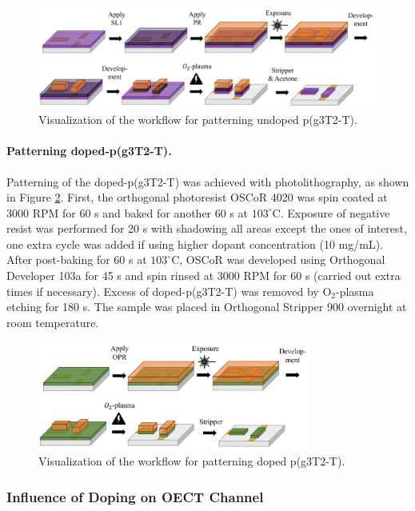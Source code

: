 \begin{figure}[ht]
	\centering
	\includegraphics[width=12cm]{Images/pdf/undoped-patterning.pdf}
	\caption{Visualization of the workflow for patterning undoped p(g3T2-T).}
	\label{fig:undopedpat}
\end{figure}

\paragraph{Patterning doped-p(g3T2-T).}Patterning of the doped-p(g3T2-T) was achieved with photolithography, as shown in Figure \ref{fig:dopedpat}. First, the orthogonal photoresist OSCoR 4020 was spin coated at 3000 RPM for 60 s and baked for another 60 s at $103^{\circ}$C. Exposure of negative resist was performed for 20 s with shadowing all areas except the ones of interest, one extra cycle was added if using higher dopant concentration (10 mg/mL). After post-baking for 60 s at $103^{\circ}$C, OSCoR was developed using Orthogonal Developer 103a for 45 s and spin rinsed at 3000 RPM for 60 s (carried out extra times if necessary). Excess of doped-p(g3T2-T) was removed by O$_{2}$-plasma etching for 180 s. The sample was placed in Orthogonal Stripper 900 overnight at room temperature.

\begin{figure}[ht]
	\centering
	\includegraphics[width=9cm]{Images/pdf/doped-patterning.pdf}
	\caption{Visualization of the workflow for patterning doped p(g3T2-T).}
	\label{fig:dopedpat}
\end{figure}

\subsubsection{Influence of Doping on OECT Channel} \label{subsec:photo}

